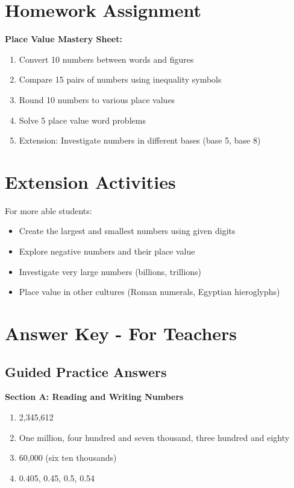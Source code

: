 \documentclass{article}
\begin{document}
\section{Homework Assignment}

\textbf{Place Value Mastery Sheet:}
\begin{enumerate}
    \item Convert 10 numbers between words and figures
    \item Compare 15 pairs of numbers using inequality symbols
    \item Round 10 numbers to various place values
    \item Solve 5 place value word problems
    \item Extension: Investigate numbers in different bases (base 5, base 8)
\end{enumerate}

\section{Extension Activities}

For more able students:
\begin{itemize}
    \item Create the largest and smallest numbers using given digits
    \item Explore negative numbers and their place value
    \item Investigate very large numbers (billions, trillions)
    \item Place value in other cultures (Roman numerals, Egyptian hieroglyphs)
\end{itemize}

\newpage

\section*{Answer Key - For Teachers}

\subsection*{Guided Practice Answers}

\textbf{Section A: Reading and Writing Numbers}
\begin{enumerate}
    \item 2,345,612
    \item One million, four hundred and seven thousand, three hundred and eighty
    \item 60,000 (six ten thousands)
    \item 0.405, 0.45, 0.5, 0.54
\end{enumerate}
\end{document}
